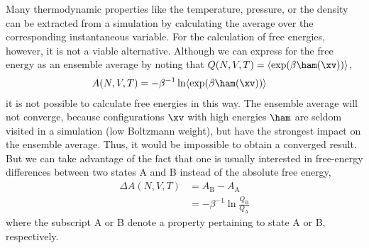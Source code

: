 Many thermodynamic properties like the temperature, pressure, or the density
can be extracted from a simulation by calculating the average over the
corresponding instantaneous variable.%
%
For the calculation of free energies, however, it is not a viable alternative.\cite{KI93.1,TU10.1}
%
Although we can express  for the free energy as an ensemble average
by noting that $Q(N,V,T)=\langle \exp (\beta \ham (\xv)) \rangle$,
%
\begin{align}
    A(N,V,T)&=-\beta^{-1} \ln \langle \exp (\beta \ham (\xv)) \rangle
\end{align}
%
it is not 
possible to calculate free energies in this way. The ensemble
average will not converge, because configurations $\xv$ with high energies $\ham$
are seldom visited in a simulation (low Boltzmann weight), but have the strongest
impact on the ensemble
average. Thus, 
it would be impossible to obtain
a converged result.
%
But we can take advantage of the fact that one is usually interested
in free-energy differences between two states A and B instead of the absolute free energy, \ie{}
%
\begin{align}
    \Delta A(N,V,T)&= A_\mathrm{B}-A_\mathrm{A} \\
    &= -\beta^{-1} \ln \frac{Q_{\mathrm{B}}}{Q_{\mathrm{A}}}%
\end{align}
%
where the subscript A or B denote a property pertaining to state A or B, respectively.
%


